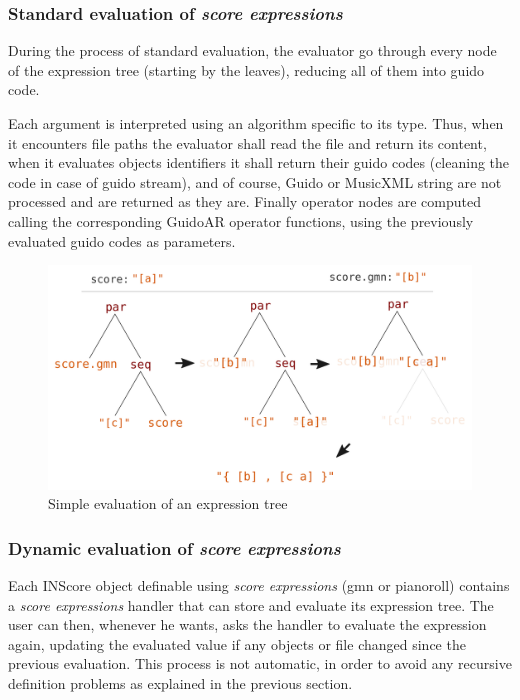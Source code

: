 \documentclass{article}
\newcommand{\sExpr}{\emph{score expressions} }
\begin{document}
\subsubsection{Standard evaluation of \sExpr}
During the process of standard evaluation, the evaluator go through every node of the expression tree (starting by the leaves), reducing all of them into guido code.

Each argument is interpreted using an algorithm specific to its type. Thus, when it encounters file paths the evaluator shall read the file and return its content, when it evaluates objects identifiers it shall return their guido codes (cleaning the code in case of guido stream), and of course, Guido or MusicXML string are not processed and are returned as they are. Finally operator nodes are computed calling the corresponding GuidoAR operator functions, using the previously evaluated guido codes as parameters.

\begin{figure}[th]
\centering
\includegraphics[width=0.9\columnwidth]{imgs/classicEval}
\caption{Simple evaluation of an expression tree
\label{fig:example}}
\end{figure}




\subsubsection{Dynamic evaluation of \sExpr}

Each INScore object definable using \sExpr (gmn or pianoroll) contains a \sExpr handler that can store and evaluate  its expression tree. The user can then, whenever he wants, asks the handler to evaluate the expression again, updating the evaluated value if any objects or file changed since the previous evaluation. This process is not automatic, in order to avoid any recursive definition problems as explained in the previous section.
\end{document}
